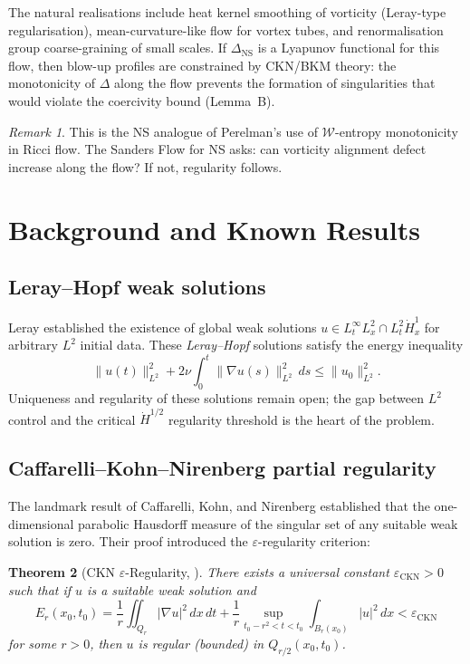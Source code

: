 \documentclass[11pt]{article}
\newtheorem{theorem}{Theorem}[section]
\theoremstyle{definition}
\theoremstyle{remark}
\newtheorem{remark}[theorem]{Remark}
\newcommand{\eps}{\varepsilon}
\begin{document}
\noindent
The natural realisations include heat kernel smoothing of vorticity (Leray-type
regularisation), mean-curvature-like flow for vortex tubes, and renormalisation group
coarse-graining of small scales. If $\Delta_{\mathrm{NS}}$ is a Lyapunov functional
for this flow, then blow-up profiles are constrained by CKN/BKM theory: the monotonicity
of $\Delta$ along the flow prevents the formation of singularities that would violate
the coercivity bound (Lemma~B).

\begin{remark}
This is the NS analogue of Perelman's use of $\mathcal{W}$-entropy monotonicity in
Ricci flow. The Sanders Flow for NS asks: can vorticity alignment defect increase
along the flow? If not, regularity follows.
\end{remark}

\section{Background and Known Results}
\label{sec:background}

\subsection{Leray--Hopf weak solutions}

Leray \cite{Leray} established the existence of global weak solutions
$u \in L^\infty_t L^2_x \cap L^2_t \dot{H}^1_x$ for arbitrary $L^2$ initial data.
These \emph{Leray--Hopf} solutions satisfy the energy inequality
\[
  \|u(t)\|_{L^2}^2 + 2\nu \int_0^t \|\nabla u(s)\|_{L^2}^2\, ds
  \leq \|u_0\|_{L^2}^2.
\]
Uniqueness and regularity of these solutions remain open; the gap between $L^2$ control
and the critical $\dot{H}^{1/2}$ regularity threshold is the heart of the problem.

\subsection{Caffarelli--Kohn--Nirenberg partial regularity}

The landmark result of Caffarelli, Kohn, and Nirenberg \cite{CKN} established that
the one-dimensional parabolic Hausdorff measure of the singular set of any suitable
weak solution is zero.  Their proof introduced the $\eps$-regularity criterion:

\begin{theorem}[CKN $\eps$-Regularity, {\cite{CKN}}]
\label{thm:CKN}
There exists a universal constant $\eps_{\mathrm{CKN}} > 0$ such that if $u$ is a
suitable weak solution and
\[
  E_r(x_0, t_0) = \frac{1}{r}\iint_{Q_r} |\nabla u|^2\, dx\, dt
  + \frac{1}{r}\sup_{t_0 - r^2 < t < t_0}\int_{B_r(x_0)} |u|^2\, dx
  < \eps_{\mathrm{CKN}}
\]
for some $r > 0$, then $u$ is regular (bounded) in $Q_{r/2}(x_0, t_0)$.
\end{theorem}
\end{document}
